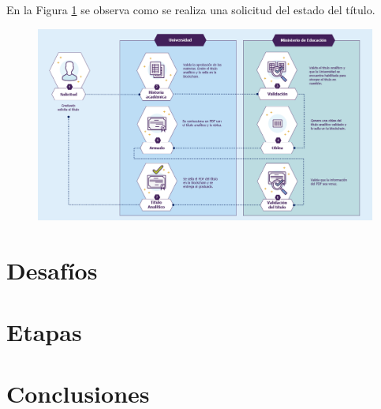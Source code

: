 \documentclass[11pt,a4paper]{article}
\begin{document}
        En la Figura \ref{fig:cuadro_problematica} se observa como se realiza una solicitud 
        del estado del título.
         
        \begin{figure}
            \centering
            \includegraphics[width=\textwidth]{Img/cuadro_problematica.png}
            \caption{}
            \label{fig:cuadro_problematica}
        \end{figure}



    \section{Desafíos}

    \section{Etapas}

    \section{Conclusiones}
\end{document}
